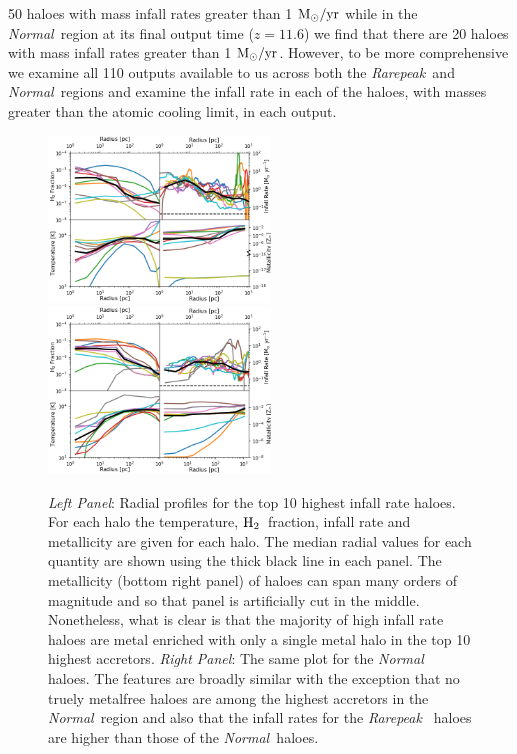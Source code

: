 \documentclass[graphics, twocolumn, usenatbib]{mn2e}
\newcommand{\msolaryr} {$\rm{M_{\odot}/yr}~$}
\newcommand{\msolaryrc} {$\rm{M_{\odot}/yr}$}
\newcommand{\molH} {$\rm{H_2}$~}
\newcommand{\rarepeak} {\textit{Rarepeak~}}
\newcommand{\normal} {\textit{Normal~}}
\begin{document}
50 haloes with mass infall rates greater than 1 \msolaryr while in the \normal region at its final
output time ($z = 11.6$) we find that there are 20 haloes with mass infall rates
greater than 1 \msolaryrc. However, to be more comprehensive we examine all 110 outputs available to
us across both the \rarepeak and \normal regions and examine the infall rate in each of the haloes,
with masses greater than the atomic cooling limit, in each output. \\
\begin{figure}
\centering
\begin{minipage}{175mm}      \begin{center} 
\centerline{
\includegraphics[width=0.525\textwidth]{FIGURES/MultiPlot_Rarepeak.png}
\includegraphics[width=0.525\textwidth]{FIGURES/MultiPlot_Normal.png}}
\caption{\textit{Left Panel}: Radial profiles for the top 10 highest infall rate haloes. For
  each halo the temperature, \molH fraction, infall rate and metallicity are given for
  each halo. The median radial values for each quantity are shown using the
  thick black line in each panel. The metallicity (bottom right panel) of haloes can span many
  orders of magnitude and so that panel is artificially cut in the middle. Nonetheless, what is
  clear is that the majority of high infall rate haloes are metal enriched with only a single
  metal halo in the top 10 highest accretors. \textit{Right Panel}: The same plot for the \normal
  haloes. The features are broadly similar with the exception that no truely metalfree haloes are
  among the highest accretors in the \normal region and also that the infall rates for the \rarepeak
  haloes are higher than those of the \normal haloes. 
} \label{Fig:RadialProfiles}
\end{center} \end{minipage}

\end{figure}
\end{document}
